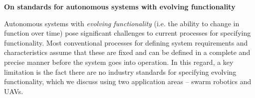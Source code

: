 \documentclass[sigconf]{acmart}
\begin{document}

%

\textbf{On standards for autonomous systems with evolving functionality}

Autonomous systems with \textit{evolving functionality} (i.e. the ability to change in function over time) pose significant challenges to current processes for specifying functionality. 
Most conventional processes for defining system requirements and characteristics assume that these are fixed and can be defined in a complete and precise manner before the system goes into operation. 
In this regard, a key limitation is the fact there are no industry standards for specifying evolving functionality, which we discuss using two application areas -- swarm robotics and UAVs.
\end{document}
